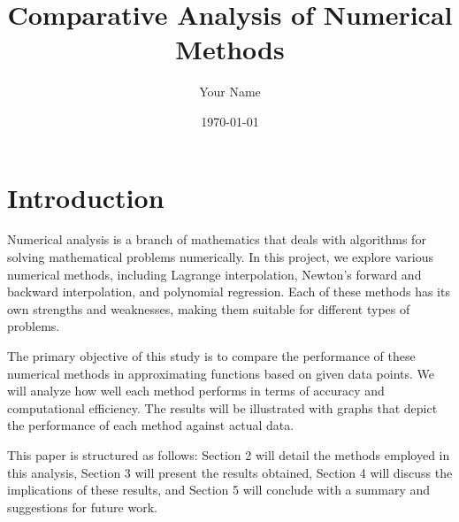 \documentclass{article}
\title{Comparative Analysis of Numerical Methods}
\author{Your Name}
\date{\today}
\begin{document}
\maketitle

\section{Introduction}

Numerical analysis is a branch of mathematics that deals with algorithms for solving mathematical problems numerically. In this project, we explore various numerical methods, including Lagrange interpolation, Newton's forward and backward interpolation, and polynomial regression. Each of these methods has its own strengths and weaknesses, making them suitable for different types of problems.

The primary objective of this study is to compare the performance of these numerical methods in approximating functions based on given data points. We will analyze how well each method performs in terms of accuracy and computational efficiency. The results will be illustrated with graphs that depict the performance of each method against actual data.

This paper is structured as follows: Section 2 will detail the methods employed in this analysis, Section 3 will present the results obtained, Section 4 will discuss the implications of these results, and Section 5 will conclude with a summary and suggestions for future work.
\end{document}
